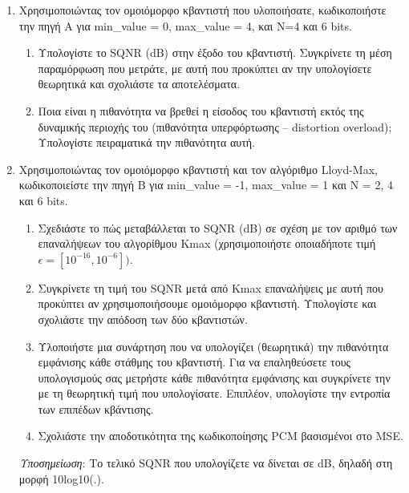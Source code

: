\documentclass{article}
\begin{document}
\begin{enumerate}
    \item Χρησιμοποιώντας τον ομοιόμορφο κβαντιστή που υλοποιήσατε, κωδικοποιήστε την πηγή Α για min\_value = 0, max\_value = 4, και Ν=4 και 6 bits.
    
    \begin{enumerate}[label=(\roman*)]
        \item Υπολογίστε το SQNR (dB) στην έξοδο του κβαντιστή. Συγκρίνετε τη μέση παραμόρφωση που μετράτε, με αυτή που προκύπτει αν την υπολογίσετε θεωρητικά και σχολιάστε τα αποτελέσματα.
        \item Ποια είναι η πιθανότητα να βρεθεί η είσοδος του κβαντιστή εκτός της δυναμικής περιοχής του (πιθανότητα υπερφόρτωσης – distortion overload); Υπολογίστε πειραματικά την πιθανότητα αυτή.
    \end{enumerate}
    
    \item Χρησιμοποιώντας τον ομοιόμορφο κβαντιστή και τον αλγόριθμο Lloyd-Max, κωδικοποιείστε την πηγή Β για min\_value = -1, max\_value = 1 και Ν = 2, 4 και 6 bits.
    
    \begin{enumerate}[label=(\roman*)]
        \item Σχεδιάστε το πώς μεταβάλλεται το SQNR (dB) σε σχέση με τον αριθμό των επαναλήψεων του αλγορίθμου Kmax (χρησιμοποιήστε οποιαδήποτε τιμή $\epsilon = [10^{-16}, 10^{-6}] )$.
        \item Συγκρίνετε τη τιμή του SQNR μετά από Kmax επαναλήψεις με αυτή που προκύπτει αν χρησιμοποιήσουμε ομοιόμορφο κβαντιστή. Υπολογίστε και σχολιάστε την απόδοση των δύο κβαντιστών.
        \item Υλοποιήστε μια συνάρτηση που να υπολογίζει (θεωρητικά) την πιθανότητα εμφάνισης κάθε στάθμης του κβαντιστή. Για να επαληθεύσετε τους υπολογισμούς σας μετρήστε κάθε πιθανότητα εμφάνισης και συγκρίνετε την με τη θεωρητική τιμή που υπολογίσατε. Επιπλέον, υπολογίστε την εντροπία των επιπέδων κβάντισης.
        \item Σχολιάστε την αποδοτικότητα της κωδικοποίησης PCΜ βασισμένοι στο MSE.
    \end{enumerate}
    
    \emph{Υποσημείωση}: Το τελικό SQNR που υπολογίζετε να δίνεται σε dB, δηλαδή στη μορφή 10log10(.).
\end{enumerate}
\end{document}
